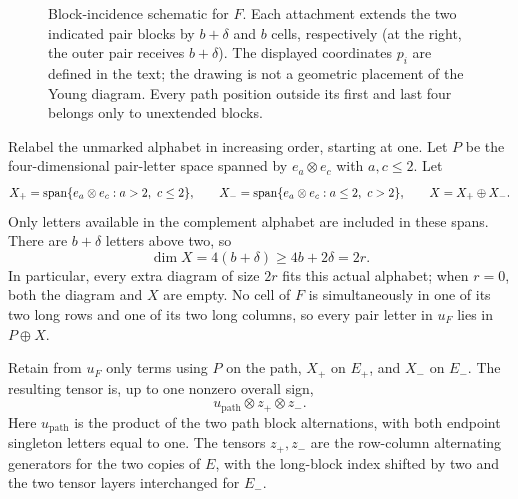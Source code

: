 \begin{figure}[ht]
\centering
{}
\caption{Block-incidence schematic for $F$.  Each attachment extends
the two indicated pair blocks by $b+\delta$ and $b$ cells, respectively
(at the right, the outer pair receives $b+\delta$).
The displayed coordinates $p_i$ are defined in the text; the drawing
is not a geometric placement of the Young diagram.  Every path position
outside its first and last four belongs only to unextended blocks.}
\label{fig:band-attachments}
\end{figure}

Relabel the unmarked alphabet in increasing order, starting at one.
Let $P$ be the four-dimensional pair-letter space spanned by
$e_a\otimes e_c$ with $a,c\le2$.  Let
\[
 X_+=\Span\{e_a\otimes e_c:a>2,\ c\le2\},\qquad
 X_-=\Span\{e_a\otimes e_c:a\le2,\ c>2\},\qquad
 X=X_+\oplus X_-.
\]
Only letters available in the complement alphabet are included in
these spans.  There are $b+\delta$ letters above two, so
\[
 \dim X=4(b+\delta)\ge 4b+2\delta=2r.
\]
In particular, every extra diagram of size $2r$ fits this actual
alphabet; when $r=0$, both the diagram and $X$ are empty.
No cell of $F$ is simultaneously in one of its two long rows and
one of its two long columns, so every pair letter in $u_F$ lies in
$P\oplus X$.

\begin{lemma}\label{band:separated}
Retain from $u_F$ only terms using $P$ on the path, $X_+$ on $E_+$,
and $X_-$ on $E_-$.  The resulting tensor is, up to one nonzero
overall sign,
\begin{equation}\label{eq:band-separated}
 u_{\mathrm{path}}\otimes z_+\otimes z_-.
\end{equation}
Here $u_{\mathrm{path}}$ is the product of the two path block
alternations, with both endpoint singleton letters equal to one.
The tensors $z_+,z_-$ are the row-column alternating generators
for the two copies of $E$, with the long-block index shifted by two
and the two tensor layers interchanged for $E_-$.
\end{lemma}

